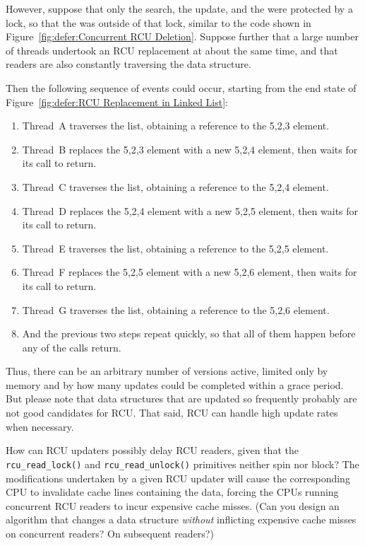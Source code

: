\begin{enumerate}
	However, suppose that only the search, the update, and the
	 were protected by a lock, so that
	the  was outside of that lock, similar
	to the code shown in
	Figure~\ref{fig:defer:Concurrent RCU Deletion}.
	Suppose further that a large number of threads undertook an
	RCU replacement at about the same time, and that readers
	are also constantly traversing the data structure.

	Then the following sequence of events could occur, starting from
	the end state of
	Figure~\ref{fig:defer:RCU Replacement in Linked List}:

	\begin{enumerate}
	\item	Thread~A traverses the list, obtaining a reference to
		the 5,2,3 element.
	\item	Thread~B replaces the 5,2,3 element with a new
		5,2,4 element, then waits for its 
		call to return.
	\item	Thread~C traverses the list, obtaining a reference to
		the 5,2,4 element.
	\item	Thread~D replaces the 5,2,4 element with a new
		5,2,5 element, then waits for its 
		call to return.
	\item	Thread~E traverses the list, obtaining a reference to
		the 5,2,5 element.
	\item	Thread~F replaces the 5,2,5 element with a new
		5,2,6 element, then waits for its 
		call to return.
	\item	Thread~G traverses the list, obtaining a reference to
		the 5,2,6 element.
	\item	And the previous two steps repeat quickly, so that all
		of them happen before any of the 
		calls return.
	\end{enumerate}

	Thus, there can be an arbitrary number of versions active,
	limited only by memory and by how many updates could be completed
	within a grace period.
	But please note that data structures that are updated so frequently
	probably are not good candidates for RCU.
	That said, RCU can handle high update rates when necessary.

\QuickQ{}
	How can RCU updaters possibly delay RCU readers, given that the
	{\tt rcu\_read\_lock()} and {\tt rcu\_read\_unlock()}
	primitives neither spin nor block?
\QuickA{}
	The modifications undertaken by a given RCU updater will cause the
	corresponding CPU to invalidate cache lines containing the data,
	forcing the CPUs running concurrent RCU readers to incur expensive
	cache misses.
	(Can you design an algorithm that changes a data structure
	\emph{without}
	inflicting expensive cache misses on concurrent readers?
	On subsequent readers?)


\end{enumerate}
